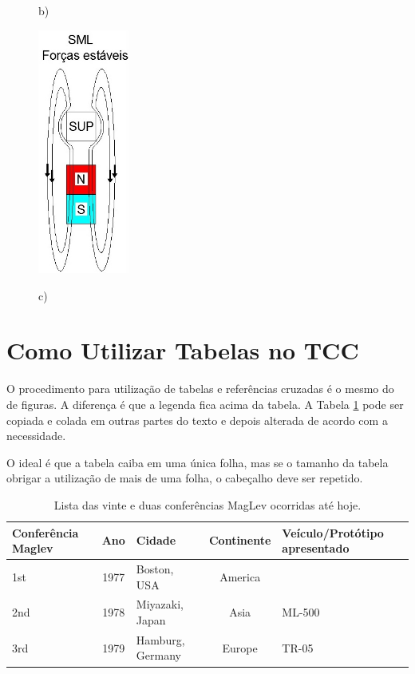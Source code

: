 \documentclass[
        oneside,      %
        english,			
        brazil			 
        ]{configcefetmglpd}
\begin{document}
\begin{figure}[h]
\begin{minipage}[t]{6cm}
		\par \centering b)
		\label{fig:EDL}
	\end{minipage}%
	\hspace{1cm}
\begin{minipage}[t]{3cm}%
	\includegraphics[width=3cm]{cap3_3.jpg}
	\par \centering c)
	\label{fig:SML}
\end{minipage}%
	\label{fig:1figs}%
\end{figure}

\section{Como Utilizar Tabelas no TCC}
O procedimento para utilização de tabelas e referências cruzadas é o mesmo do de figuras. A diferença é que a legenda fica acima da tabela. A Tabela \ref{tab:lista_Mag} pode ser copiada e colada em outras partes do texto e depois alterada de acordo com a necessidade.

O ideal é que a tabela caiba em uma única folha, mas se o tamanho da tabela obrigar a utilização de mais de uma folha, o cabeçalho deve ser repetido.

\begin{table}[!h]
	\normalsize
	\caption{Lista das vinte e duas conferências MagLev ocorridas até hoje.}
	\label{tab:lista_Mag}
	\begin{center}
		\begin{tabular}{ l | c | l | c | l}
			\hline
			Conferência Maglev & Ano & Cidade & Continente & Veículo/Protótipo apresentado\\ \hline
			1st & 1977 & Boston, USA & America &  \\
			2nd & 1978 & Miyazaki, Japan & Asia & ML-500 \\
			3rd & 1979 & Hamburg, Germany & Europe & TR-05 \\
		\end{tabular}
	\end{center}
\end{table}
\end{document}
